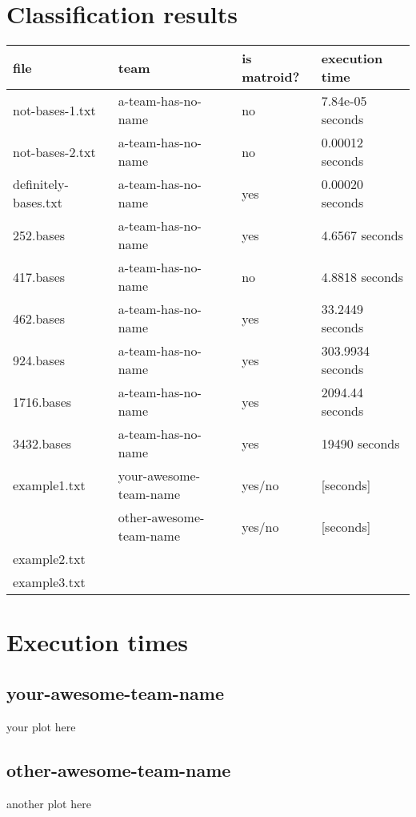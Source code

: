 \documentclass[11pt]{amsart}
\begin{document}
\section{Classification results}

\begin{center}
  \begin{tabular}[c]{llll}
    file
    & team
    & is matroid?
    & execution time
    \\\hline
    not-bases-1.txt 
    & a-team-has-no-name
    & no
    & 7.84e-05 seconds
    \\\hline
    not-bases-2.txt 
    & a-team-has-no-name
    & no
    & 0.00012 seconds
    \\\hline
    definitely-bases.txt 
    & a-team-has-no-name
    & yes
    & 0.00020 seconds
    \\\hline
    252.bases
    & a-team-has-no-name
    & yes
    & 4.6567 seconds
    \\\hline
    417.bases
    & a-team-has-no-name
    & no
    & 4.8818 seconds
    \\\hline
    462.bases
    & a-team-has-no-name
    & yes
    & 33.2449 seconds
    \\\hline
    924.bases
    & a-team-has-no-name
    & yes
    & 303.9934 seconds
    \\\hline
    1716.bases
    & a-team-has-no-name
    & yes
    & 2094.44 seconds
    \\\hline
    3432.bases
    & a-team-has-no-name
    & yes
    & 19490 seconds
    \\\hline
    example1.txt 
    & your-awesome-team-name
    & yes/no
    & [seconds]
    \\
    & other-awesome-team-name
    & yes/no
    & [seconds]
    \\\hline
    example2.txt
    &
    \\\hline
    example3.txt
  \end{tabular}
\end{center}

\section{Execution times}

\subsection{your-awesome-team-name}

your plot here

\subsection{other-awesome-team-name}

another plot here
\end{document}
